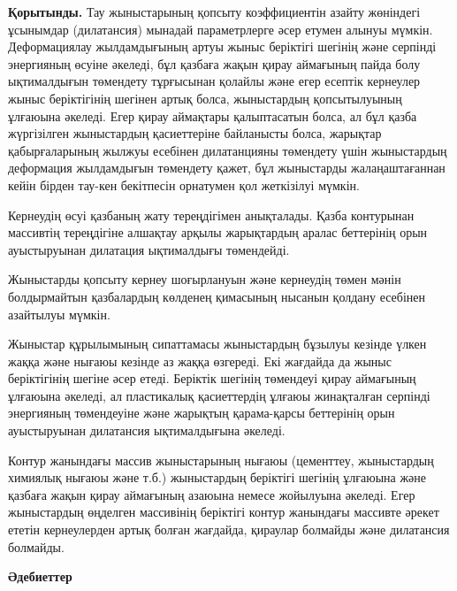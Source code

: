 \begin{multicols}{2}
{\bfseries Қорытынды.} Тау жыныстарының қопсыту коэффициентін азайту
жөніндегі ұсынымдар (дилатансия) мынадай параметрлерге әсер етумен
алынуы мүмкін. Деформациялау жылдамдығының артуы жыныс беріктігі шегінің
және серпінді энергияның өсуіне әкеледі, бұл қазбаға жақын қирау
аймағының пайда болу ықтималдығын төмендету тұрғысынан қолайлы және егер
есептік кернеулер жыныс беріктігінің шегінен артық болса, жыныстардың
қопсытылуының ұлғаюына әкеледі. Егер қирау аймақтары қалыптасатын болса,
ал бұл қазба жүргізілген жыныстардың қасиеттеріне байланысты болса,
жарықтар қабырғаларының жылжуы есебінен дилатанцияны төмендету үшін
жыныстардың деформация жылдамдығын төмендету қажет, бұл жыныстарды
жалаңаштағаннан кейін бірден тау-кен бекітпесін орнатумен қол жеткізілуі
мүмкін.

Кернеудің өсуі қазбаның жату тереңдігімен анықталады. Қазба контурынан
массивтің тереңдігіне алшақтау арқылы жарықтардың аралас беттерінің орын
ауыстыруынан дилатация ықтималдығы төмендейді.

Жыныстарды қопсыту кернеу шоғырлануын және кернеудің төмен мәнін
болдырмайтын қазбалардың көлденең қимасының нысанын қолдану есебінен
азайтылуы мүмкін.

Жыныстар құрылымының сипаттамасы жыныстардың бұзылуы кезінде үлкен жаққа
және нығаюы кезінде аз жаққа өзгереді. Екі жағдайда да жыныс
беріктігінің шегіне әсер етеді. Беріктік шегінің төмендеуі қирау
аймағының ұлғаюына әкеледі, ал пластикалық қасиеттердің ұлғаюы
жинақталған серпінді энергияның төмендеуіне және жарықтың қарама-қарсы
беттерінің орын ауыстыруынан дилатансия ықтималдығына әкеледі.

Контур жанындағы массив жыныстарының нығаюы (цементтеу, жыныстардың
химиялық нығаюы және т.б.) жыныстардың беріктігі шегінің ұлғаюына және
қазбаға жақын қирау аймағының азаюына немесе жойылуына әкеледі. Егер
жыныстардың өңделген массивінің беріктігі контур жанындағы массивте
әрекет ететін кернеулерден артық болған жағдайда, қираулар болмайды және
дилатансия болмайды.
\end{multicols}

\begin{center}
{\bfseries Әдебиеттер}
\end{center}

